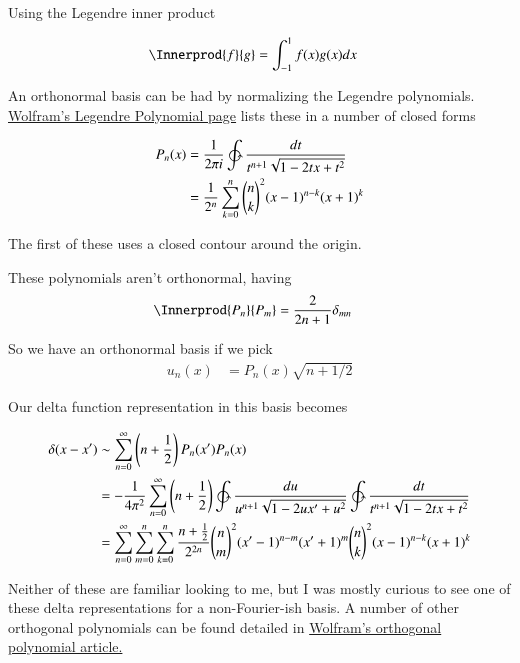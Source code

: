 Using the Legendre inner product

\begin{align*}
\Innerprod{f}{g} &= \int_{-1}^1 f(x) g(x) dx
\end{align*}

An orthonormal basis can be had by normalizing the 
Legendre polynomials.  
\href{ http://mathworld.wolfram.com/LegendrePolynomial.html }{Wolfram's Legendre Polynomial page} lists these in a number of closed forms

\begin{align*}
P_n(x) 
&= \inv{2 \pi i} \ointctrclockwise \frac{dt}{t^{n+1}\sqrt{1 - 2t x +t^2}} \\
&= \inv{2^n}\sum_{k=0}^n {\binom{n}{k}}^2 (x-1)^{n-k}(x+1)^k
\end{align*}

The first of these uses a closed contour around the origin.

These polynomials aren't orthonormal, having 
\begin{align*}
\Innerprod{P_n}{P_m} &= \frac{2}{2 n + 1}\delta_{mn}
\end{align*}

So we have an orthonormal basis if we pick
\begin{align*}
u_n(x) &= P_n(x) \sqrt{n + 1/2}
\end{align*}

Our delta function representation in this basis becomes

\begin{align*}
\delta(x-x') 
&\sim \sum_{n=0}^\infty \left(n+ \inv{2}\right) P_n(x') P_n(x) \\
&= -\inv{4\pi^2} \sum_{n=0}^\infty \left(n+ \inv{2}\right) \ointctrclockwise \frac{du}{u^{n+1}\sqrt{1 - 2u x' + u^2}} \ointctrclockwise \frac{dt}{t^{n+1}\sqrt{1 - 2t x + t^2}} \\
&= \sum_{n=0}^\infty \sum_{m=0}^n \sum_{k=0}^n \frac{n+ \inv{2}}{2^{2n}} {\binom{n}{m}}^2 (x'-1)^{n-m}(x'+1)^m {\binom{n}{k}}^2 (x-1)^{n-k}(x+1)^k
\end{align*}

Neither of these are familiar looking to me, but I was mostly curious to see one of these delta representations for a non-Fourier-ish basis.  A number of other
orthogonal polynomials can be found detailed in \href{http://mathworld.wolfram.com/OrthogonalPolynomials.html}{Wolfram's orthogonal polynomial article.}

%
%

%
